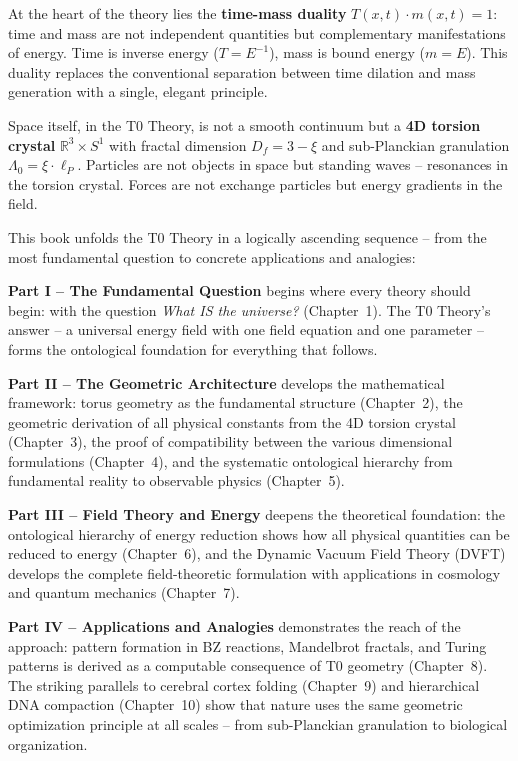 \documentclass[11pt,oneside]{book}
\begin{document}
At the heart of the theory lies the \textbf{time-mass duality} $T(x,t) \cdot m(x,t) = 1$: time and mass are not independent quantities but complementary manifestations of energy. Time is inverse energy ($T = E^{-1}$), mass is bound energy ($m = E$). This duality replaces the conventional separation between time dilation and mass generation with a single, elegant principle.

Space itself, in the T0 Theory, is not a smooth continuum but a \textbf{4D torsion crystal} $\mathbb{R}^3 \times S^1$ with fractal dimension $D_f = 3 - \xi$ and sub-Planckian granulation $\Lambda_0 = \xi \cdot \ell_P$. Particles are not objects in space but standing waves -- resonances in the torsion crystal. Forces are not exchange particles but energy gradients in the field.

\bigskip

This book unfolds the T0 Theory in a logically ascending sequence -- from the most fundamental question to concrete applications and analogies:

\textbf{Part I -- The Fundamental Question} begins where every theory should begin: with the question \textit{What IS the universe?} (Chapter~1). The T0 Theory's answer -- a universal energy field with one field equation and one parameter -- forms the ontological foundation for everything that follows.

\textbf{Part II -- The Geometric Architecture} develops the mathematical framework: torus geometry as the fundamental structure (Chapter~2), the geometric derivation of all physical constants from the 4D torsion crystal (Chapter~3), the proof of compatibility between the various dimensional formulations (Chapter~4), and the systematic ontological hierarchy from fundamental reality to observable physics (Chapter~5).

\textbf{Part III -- Field Theory and Energy} deepens the theoretical foundation: the ontological hierarchy of energy reduction shows how all physical quantities can be reduced to energy (Chapter~6), and the Dynamic Vacuum Field Theory (DVFT) develops the complete field-theoretic formulation with applications in cosmology and quantum mechanics (Chapter~7).

\textbf{Part IV -- Applications and Analogies} demonstrates the reach of the approach: pattern formation in BZ reactions, Mandelbrot fractals, and Turing patterns is derived as a computable consequence of T0 geometry (Chapter~8). The striking parallels to cerebral cortex folding (Chapter~9) and hierarchical DNA compaction (Chapter~10) show that nature uses the same geometric optimization principle at all scales -- from sub-Planckian granulation to biological organization.
\end{document}
